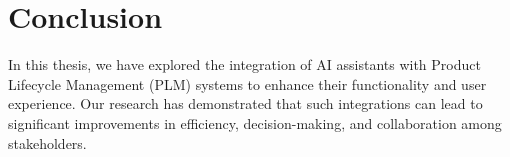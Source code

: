 \chapter{Conclusion}
\label{ch:conclusion}

In this thesis, we have explored the integration of AI assistants with Product Lifecycle Management (PLM) systems to enhance their functionality and user experience. Our research has demonstrated that such integrations can lead to significant improvements in efficiency, decision-making, and collaboration among stakeholders.